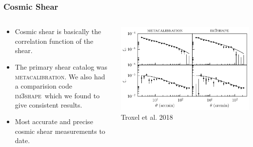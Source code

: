 \documentclass[aspectratio=169]{beamer}
\newcommand{\mcal}{\textsc{metacalibration}}
\newcommand{\imshape}{\textsc{im3shape}}
\begin{document}
{\begin{columns}
    \end{columns}

}

\frame
{

    \frametitle{Cosmic Shear}


    \begin{columns}
        \begin{column}{0.5\textwidth}
            \begin{itemize}

                \item Cosmic shear is basically the correlation
                    function of the shear.

                \item The primary shear catalog was \mcal.  We also
                    had a comparision code \imshape\ which we
                    found to give consistent results.

                \item Most accurate and precise cosmic shear measurements to
                    date.

            \end{itemize}

        \end{column}
        \begin{column}{0.5\textwidth}
            \centering
                \includegraphics[width=\linewidth]{xi_notomo.pdf}
                \newline
                {\tiny Troxel et al. 2018}
        \end{column}

    \end{columns}

}
\end{document}
